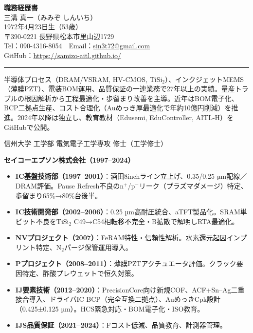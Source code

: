 \documentclass[engine=luatex,ja=standard,11pt]{bxjsarticle}
\begin{document}
\begin{center}
{\Huge \textbf{職務経歴書}} \\[1.2em]
{\Large 三溝 真一（みみぞ しんいち）} \\[0.5em]
1972年4月23日生（53歳） \\[0.3em]
〒390-0221 長野県松本市里山辺1729 \\[0.3em]
Tel：090-4316-8054　Email：\href{mailto:sin3t72@gmail.com}{sin3t72@gmail.com} \\[0.3em]
GitHub：\href{https://samizo-aitl.github.io/}{https://samizo-aitl.github.io/}
\end{center}

\vspace{1em}
\hrule
\vspace{1em}

半導体プロセス（DRAM/VSRAM, HV-CMOS, TiSi$_2$）、インクジェットMEMS（薄膜PZT）、電装BOM運用、品質保証の一連業務で27年以上の実績。量産トラブルの根因解析から工程最適化・歩留まり改善を主導。近年はBOM電子化、BCP二拠点生産、コスト合理化（Auめっき厚最適化で年約10億円削減）を推進。2024年以降は独立し、教育教材（Edusemi, EduController, AITL-H）をGitHubで公開。

信州大学 工学部 電気電子工学専攻 修士（工学修士）

\textbf{セイコーエプソン株式会社（1997–2024）}

\begin{itemize}
  \item \textbf{IC基盤技術部（1997–2001）}：酒田8inchライン立上げ、0.35/0.25 µm配線／DRAM評価。Pause Refresh不良のn$^+$/p$^-$リーク（プラズマダメージ）特定、歩留まり65\%→80\%台後半。
  \item \textbf{IC技術開発部（2002–2006）}：0.25 µm高耐圧統合、aTFT製品化。SRAM単ビット不良をTiSi$_2$ C49→C54相転移不完全・B拡散で解明しRTA最適化。
  \item \textbf{NVプロジェクト（2007）}：FeRAM特性・信頼性解析。水素還元起因インプリント特定、N$_2$パージ保管運用導入。
  \item \textbf{Pプロジェクト（2008–2011）}：薄膜PZTアクチュエータ評価。クラック要因特定、酢酸プレウェットで恒久対策。
  \item \textbf{IJ要素技術（2012–2020）}：PrecisionCore向け新規COF、ACF+Sn–Ag二重接合導入、ドライバIC BCP（完全互換二拠点）、AuめっきCpk設計（0.425±0.125 µm）。HCS緊急対応・BOM電子化・ISO教育。
  \item \textbf{IJS品質保証（2021–2024）}：Fコスト低減、品質教育、計測器管理。
\end{itemize}
\end{document}
